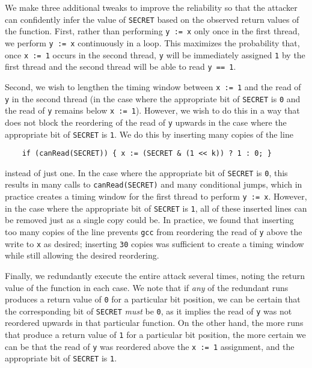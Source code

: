 We make three additional tweaks to improve the reliability so that the attacker
can confidently infer the value of \verb|SECRET| based on the observed return
values of the function.
First, rather than performing \verb|y := x| only once in the first thread, we
perform \verb|y := x| continuously in a loop.
This maximizes the probability that, once \verb|x := 1| occurs in the second
thread, \verb|y| will be immediately assigned \verb|1| by the first thread
and the second thread will be able to read \verb|y == 1|.

Second, we wish to lengthen the timing window between \verb|x := 1| and the
read of \verb|y| in the second thread (in the case where the appropriate bit of
\verb|SECRET| is \verb|0| and the read of \verb|y| remains below
\verb|x := 1|).
However, we wish to do this in a way that does not block the reordering of the
read of \verb|y| upwards in the case where the appropriate bit of \verb|SECRET|
is \verb|1|.
We do this by inserting many copies of the line
\begin{verbatim}
    if (canRead(SECRET)) { x := (SECRET & (1 << k)) ? 1 : 0; }
\end{verbatim}
instead of just one.
In the case where the appropriate bit of \verb|SECRET| is \verb|0|, this
results in many calls to \verb|canRead(SECRET)| and many conditional jumps,
which in practice creates a timing window for the first thread to perform
\verb|y := x|.
However, in the case where the appropriate bit of \verb|SECRET| is \verb|1|,
all of these inserted lines can be removed just as a single copy could be.
In practice, we found that inserting too many copies of the line prevents
\verb|gcc| from reordering the read of \verb|y| above the write to \verb|x| as
desired; inserting \verb|30| copies was sufficient to create a timing window
while still allowing the desired reordering.

Finally, we redundantly execute the entire attack several times, noting the
return value of the function in each case.
We note that if \emph{any} of the redundant runs produces a return value of
\verb|0| for a particular bit position, we can be certain that the
corresponding bit of \verb|SECRET| \emph{must} be \verb|0|, as it implies the
read of \verb|y| was not reordered upwards in that particular function.
On the other hand, the more runs that produce a return value of \verb|1| for a
particular bit position, the more certain we can be that the read of \verb|y|
was reordered above the \verb|x := 1| assignment, and the appropriate bit of
\verb|SECRET| is \verb|1|.

